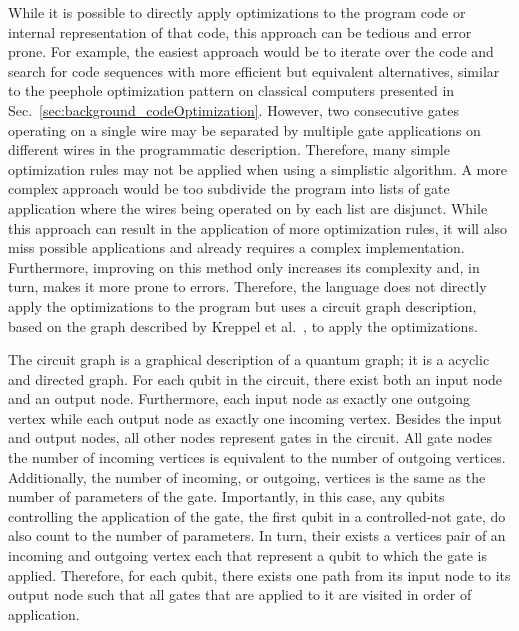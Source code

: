 While it is possible to directly apply optimizations to the program code or internal representation of that code, this approach can be tedious and error prone. For example, the easiest approach would be to iterate over the code and search for code sequences with more efficient but equivalent alternatives, similar to the peephole optimization pattern on classical computers presented in Sec.~\ref{sec:background_codeOptimization}. However, two consecutive gates operating on a single wire may be separated by multiple gate applications on different wires in the programmatic description. Therefore, many simple optimization rules may not be applied when using a simplistic algorithm. A more complex approach would be too subdivide the program into lists of gate application where the wires being operated on by each list are disjunct. While this approach can result in the application of more optimization rules, it will also miss possible applications and already requires a complex implementation. Furthermore, improving on this method only increases its complexity and, in turn, makes it more prone to errors. Therefore, the language does not directly apply the optimizations to the program but uses a circuit graph description, based on the graph described by Kreppel et al.~\cite{KMO*23}, to apply the optimizations.

The circuit graph is a graphical description of a quantum graph; it is a acyclic and directed graph. For each qubit in the circuit, there exist both an input node and an output node. Furthermore, each input node as exactly one outgoing vertex while each output node as exactly one incoming vertex. Besides the input and output nodes, all other nodes represent gates in the circuit. All gate nodes the number of incoming vertices is equivalent to the number of outgoing vertices. Additionally, the number of incoming, or outgoing, vertices is the same as the number of parameters of the gate. Importantly, in this case, any qubits controlling the application of the gate, \eg the first qubit in a controlled-not gate, do also count to the number of parameters. In turn, their exists a vertices pair of an incoming and outgoing vertex each that represent a qubit to which the gate is applied. Therefore, for each qubit, there exists one path from its input node to its output node such that all gates that are applied to it are visited in order of application.

